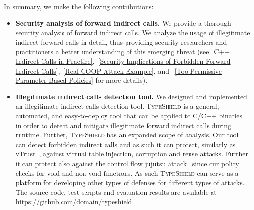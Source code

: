 In summary, we make the following contributions: \newline
\label{Contribution}
\begin{itemize}
[leftmargin=.2in]
 \item 
\textbf{Security analysis of forward indirect calls.} We provide a thorough security analysis of forward indirect calls. We analyze the usage of illegitimate indirect 
forward calls in detail, 
 thus providing security researchers and practitioners a better understanding of this emerging threat 
 (see~\ref{C++ Indirect Calls in Practice},~\ref{Security Implications of Forbidden Forward Indirect Calls},~\ref{Real COOP Attack Example}, and ~\ref{Too Permissive Parameter-Based Policies}
 for more details).

 \item 
\textbf{Illegitimate indirect calls detection tool.} We designed and implemented an illegitimate indirect calls detection tool. \textsc{TypeShield} is a general, 
automated, and easy-to-deploy 
 tool that can be applied to C/C++ binaries in order to detect and mitigate illegitimate forward indirect calls  during runtime. 
 Further, \textsc{TypeShield} has an expanded scope of analysis. Our tool can detect forbidden indirect calls and as such it can protect, 
 similarly as vTrust~\cite{zhang:vtrust}, against virtual table injection, corruption and reuse attacks. Further it can protect also against the 
 control flow jujutsu attack~\cite{jujutsu} since our policy checks for void and non-void functions. 
 As such \textsc{TypeShield} can serve as a platform for developing other types of defenses for different types of attacks. The source code, test scripts and 
 evaluation results 
 are available at \url{https://github.com/domain/typeshield}.
 

\end{itemize}
